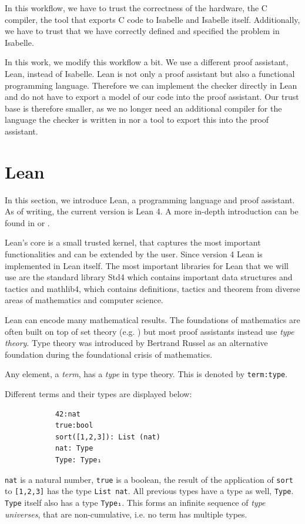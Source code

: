 In this workflow, we have to trust the correctness of the hardware, the C compiler, the tool that exports C code to Isabelle and Isabelle itself. Additionally, we have to trust that we have correctly defined and specified the problem in Isabelle.

In this work, we modify this workflow a bit. We use a different proof assistant, Lean, instead of Isabelle. Lean is not only a proof assistant but also a functional programming language. Therefore we can implement the checker directly in Lean and do not have to export a model of our code into the proof assistant. Our trust base is therefore smaller, as we no longer need an additional compiler for the language the checker is written in nor a tool to export this into the proof assistant. 


\section{Lean}
In this section, we introduce Lean, a programming language and proof assistant. As of writing, the current version is Lean 4. A more in-depth introduction can be found in \cite{theoremProvingLean} or \cite{functionalProgrammingLean}.

Lean's core is a small trusted kernel\cite{LeanSysDescr}, that captures the most important functionalities and can be extended by the user. Since version 4 Lean is implemented in Lean itself\cite{Lean4}. The most important libraries for Lean that we will use are the standard library Std4\cite{stdLean} which contains important data structures and tactics and mathlib4\cite{mathlib}, which contains definitions, tactics and theorem from diverse areas of mathematics and computer science.

Lean can encode many mathematical results. The foundations of mathematics are often built on top of set theory (e.g. \cite{logic}) but most proof assistants instead use \textit{type theory}. Type theory was introduced by Bertrand Russel as an alternative foundation during the foundational crisis of mathematics.

Any element, a \textit{term}, has a \textit{type} in type theory. This is denoted by \lstinline|term:type|. 

\begin{example}
    Different terms and their types are displayed below:
        \begin{lstlisting}
            42:nat
            true:bool
            sort([1,2,3]): List (nat)
            nat: Type
            Type: Type₁
        \end{lstlisting}

        \lstinline|nat| is a natural number, \lstinline|true| is a boolean, the result of the application of \lstinline|sort| to \lstinline|[1,2,3]| has the type \lstinline|List nat|. All previous types have a type as well, \lstinline|Type|. \lstinline|Type| itself also has a type \lstinline|Type₁|. This forms an infinite sequence of \textit{type universes}, that are non-cumulative, i.e. no term has multiple types.
\end{example}


